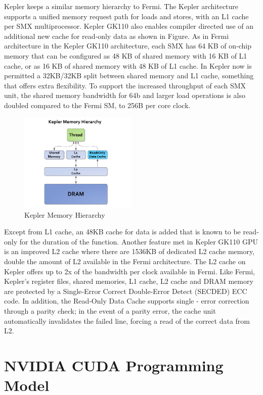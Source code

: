 Kepler keeps a similar memory hierarchy to Fermi. The Kepler architecture supports a unified memory request path for loads and stores, with an L1 cache per SMX multiprocessor. Kepler GK110 also enables compiler directed use of an additional new cache for read‐only data as shown in Figure. As in Fermi architecture in the Kepler GK110 architecture, each SMX has 64 KB of on‐chip memory that can be configured as 48 KB of shared memory with 16 KB of L1 cache, or as 16 KB of shared memory with 48 KB of L1 cache. In Kepler now is permitted a 32KB/32KB split between shared memory and L1 cache, something that offers extra flexibility. To support the increased throughput of each SMX unit, the shared memory bandwidth for 64b and larger load operations is also doubled compared to the Fermi SM, to 256B per core clock.

\begin{figure}[H]
   \centering
       \includegraphics[width=0.5\textwidth]{memory_hieranchy}
   \caption{Kepler Memory Hierarchy}
   \label{fig:memory hieranchy}
\end{figure}

Except from L1 cache, an 48KB cache for data is added that is known to be read‐only for the duration of the function. Another feature met in Kepler GK110 GPU is an improved L2 cache where there are 1536KB of dedicated L2 cache memory, double the amount of L2 available in the Fermi architecture. The L2 cache on Kepler offers up to 2x of the bandwidth per clock available in Fermi. Like Fermi, Kepler’s register files, shared memories, L1 cache, L2 cache and DRAM memory are protected by a Single‐Error Correct Double‐Error Detect (SECDED) ECC code. In addition, the Read‐Only Data Cache supports single - error correction through a parity check; in the event of a parity error, the cache unit automatically invalidates the failed line, forcing a read of the correct data from L2.

\section{NVIDIA CUDA Programming Model}

